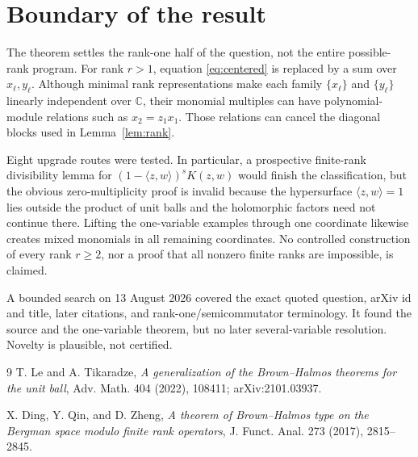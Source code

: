 \documentclass[11pt]{article}
\newcommand{\C}{\mathbb C}
\begin{document}
\section{Boundary of the result}

The theorem settles the rank-one half of the question, not the entire
possible-rank program.  For rank $r>1$, equation \eqref{eq:centered} is
replaced by a sum over $x_\ell,y_\ell$.  Although minimal rank
representations make each family $\{x_\ell\}$ and $\{y_\ell\}$ linearly
independent over $\C$, their monomial multiples can have polynomial-module
relations such as $x_2=z_1x_1$.  Those relations can cancel the diagonal
blocks used in Lemma~\ref{lem:rank}.

Eight upgrade routes were tested.  In particular, a prospective
finite-rank divisibility lemma for
$(1-\langle z,w\rangle)^sK(z,w)$ would finish the classification, but the
obvious zero-multiplicity proof is invalid because the hypersurface
$\langle z,w\rangle=1$ lies outside the product of unit balls and the
holomorphic factors need not continue there.  Lifting the one-variable
examples through one coordinate likewise creates mixed monomials in all
remaining coordinates.  No controlled construction of every rank
$r\ge2$, nor a proof that all nonzero finite ranks are impossible, is
claimed.

A bounded search on 13 August 2026 covered the exact quoted question,
arXiv id and title, later citations, and rank-one/semicommutator terminology.
It found the source and the one-variable theorem, but no later
several-variable resolution.  Novelty is plausible, not certified.

\begin{thebibliography}{9}
T. Le and A. Tikaradze,
\emph{A generalization of the Brown--Halmos theorems for the unit ball},
Adv. Math. 404 (2022), 108411; arXiv:2101.03937.

X. Ding, Y. Qin, and D. Zheng,
\emph{A theorem of Brown--Halmos type on the Bergman space modulo finite
rank operators}, J. Funct. Anal. 273 (2017), 2815--2845.
\end{thebibliography}
\end{document}
